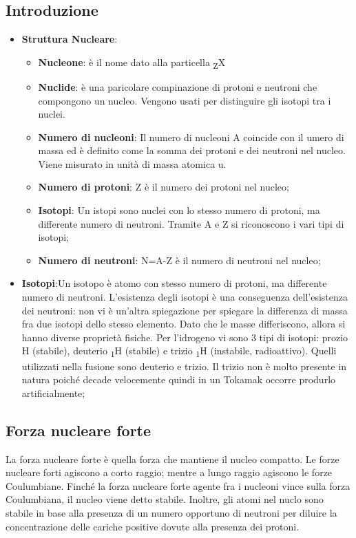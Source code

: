 \documentclass{article}
\def\SPSB#1#2{\rlap{\textsuperscript{\textcolor{black}{#1}}}\SB{#2}}
\def\SB#1{\textsubscript{\textcolor{black}{#1}}}
\begin{document}
\subsection{Introduzione}
\begin{itemize}
	\item \textbf{Struttura Nucleare}:\begin{itemize}
		      \item \textbf{Nucleone}: è il nome dato alla particella \SPSB{A}{Z}X
		      \item \textbf{Nuclide}: è una paricolare compinazione di protoni e neutroni che compongono un nucleo. Vengono usati per distinguire gli isotopi tra i nuclei.
		      \item \textbf{Numero di nucleoni}: Il numero di nucleoni A coincide con il umero di massa ed è definito come la somma dei protoni e dei neutroni nel nucleo. Viene misurato in unità di massa atomica u.
		      \item \textbf{Numero di protoni}: Z è il numero dei protoni nel nucleo;
		      \item \textbf{Isotopi}: Un istopi sono nuclei con lo stesso numero di protoni, ma differente numero di neutroni. Tramite A e Z si riconoscono i vari tipi di isotopi;
		      \item \textbf{Numero di neutroni}: N=A-Z è il numero di neutroni nel nucleo;
	      \end{itemize}
	      \item\textbf{Isotopi}:Un isotopo è atomo con stesso numero di protoni, ma differente numero di neutroni. L'esistenza degli isotopi è una conseguenza dell'esistenza dei neutroni: non vi è un'altra spiegazione per spiegare la differenza di massa fra due isotopi dello stesso elemento. Dato che le masse differiscono, allora si hanno diverse proprietà fisiche.\newline
	      Per l'idrogeno vi sono 3 tipi di isotopi: prozio H (stabile), deuterio \SPSB{2}{1}H (stabile) e trizio \SPSB{3}{1}H (instabile, radioattivo). Quelli utilizzati nella fusione sono deuterio e trizio. Il trizio non è molto presente in natura poiché decade velocemente quindi in un Tokamak occorre produrlo artificialmente;
\end{itemize}
\subsection{Forza nucleare forte}
La forza nucleare forte è quella forza che mantiene il nucleo compatto. Le forze nucleare forti agiscono a corto raggio; mentre a lungo raggio agiscono le forze Coulumbiane.\newline
Finché la forza nucleare forte agente fra i nucleoni vince sulla forza Coulumbiana, il nucleo viene detto stabile. Inoltre, gli atomi nel nuclo sono stabile in base alla presenza di un numero opportuno di neutroni per diluire la concentrazione delle cariche positive dovute alla presenza dei protoni.
\end{document}
